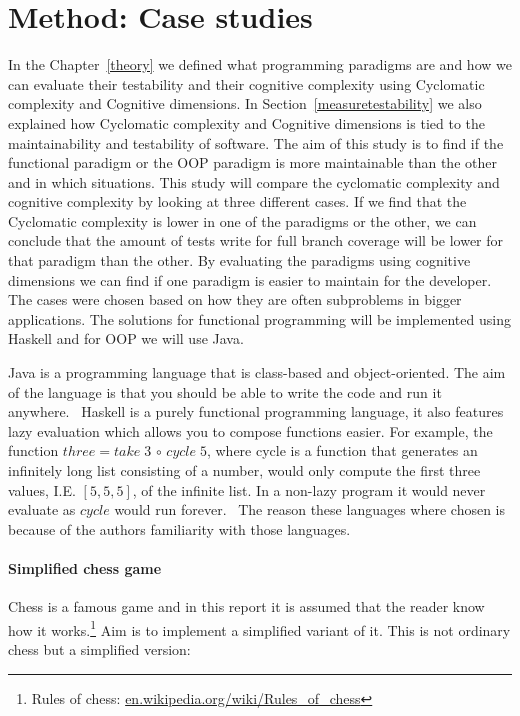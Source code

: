 \chapter{Method: Case studies}

In the Chapter~\ref{theory} we defined what programming paradigms are and how we
can evaluate their testability and their cognitive complexity using Cyclomatic
complexity and Cognitive dimensions. In Section~\ref{measuretestability} we also
explained how Cyclomatic complexity and Cognitive dimensions is tied to the
maintainability and testability of software. The aim of this study is to find if
the functional paradigm or the OOP paradigm is more maintainable than the other
and in which situations. This study will compare the cyclomatic complexity and
cognitive complexity by looking at three different cases. If we find that the
Cyclomatic complexity is lower in one of the paradigms or the other, we can
conclude that the amount of tests write for full branch coverage will be lower
for that paradigm than the other. By evaluating the paradigms using cognitive
dimensions we can find if one paradigm is easier to maintain for the developer.
The cases were chosen based on how they are often subproblems in bigger
applications. The solutions for functional programming will be implemented using
Haskell and for OOP we will use Java. 

Java is a programming language that is class-based and object-oriented. The aim
of the language is that you should be able to write the code and run it
anywhere.~\cite{java} Haskell is a purely functional programming language, it
also features lazy evaluation which allows you to compose functions easier. For
example, the function $three = take\; 3 \, \circ \, cycle\; 5$, where cycle is a
function that generates an infinitely long list consisting of a number, would
only compute the first three values, I.E. $[5,5,5]$, of the infinite list.  In a
non-lazy program it would never evaluate as $cycle$ would run
forever.~\cite{haskell} The reason these languages where chosen is because of
the authors familiarity with those languages.

\subsubsection*{Simplified chess game}

Chess is a famous game and in this report it is assumed that the reader know how
it works.\footnote{Rules of chess: \url{en.wikipedia.org/wiki/Rules_of_chess}}
Aim is to implement a simplified variant of it. This is not ordinary chess but a
simplified version:

